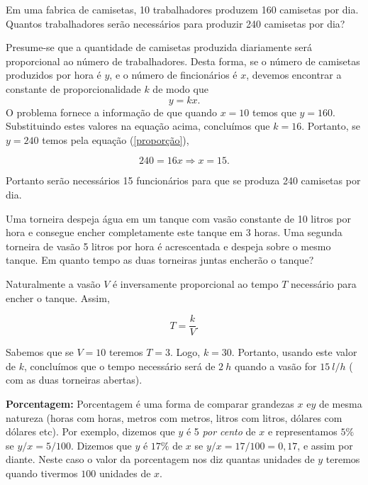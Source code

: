 \begin{exemplo} Em uma fabrica de camisetas, 10 trabalhadores produzem 160 camisetas por dia. Quantos trabalhadores serão necessários para produzir 240 camisetas por dia?

Presume-se que a quantidade de camisetas  produzida diariamente será proporcional ao número de trabalhadores. Desta forma,
se o número de camisetas produzidos por hora é $y$, e o número de fincionários é $x$, devemos encontrar a constante de proporcionalidade $k$ de modo que
\begin{equation}\label{proporção}y=kx.\end{equation}
O problema fornece a informação de que quando $x=10$ temos que $y=160$. Substituindo estes valores na equação acima, concluímos que $k=16$. Portanto, se $y=240$ temos pela equação (\ref{proporção}),

$$240= 16x\Rightarrow x=15.$$

Portanto serão necessários 15 funcionários para que se produza 240 camisetas por dia.
\end{exemplo}

\begin{exemplo} Uma torneira despeja água em um tanque com vasão constante de 10 litros por hora e consegue encher completamente este tanque em 3 horas. Uma segunda torneira de vasão 5 litros por hora é acrescentada e despeja sobre o mesmo tanque. Em quanto tempo as duas torneiras juntas encherão o tanque?

Naturalmente a vasão $V$ é inversamente proporcional ao tempo $T$ necessário para encher o tanque. Assim,

$$T=\frac{k}{V}.$$

Sabemos que se $V=10$ teremos $T=3$. Logo, $k=30$. Portanto, usando este valor de $k$, concluímos que o tempo necessário será de $2\ h$ quando a vasão for  $15\  l/h$ ( com as duas torneiras abertas).

\end{exemplo}



\noindent\textbf{Porcentagem:} Porcentagem é uma forma de comparar grandezas $x$ e$ y$ de mesma natureza (horas com horas, metros com metros, litros com litros, dólares com dólares etc).  Por exemplo, dizemos que $y$ é 5 \textit{por cento} de $x$ e representamos $5\%$  se $y/x=5/100$. Dizemos que $y$ é $17\%$ de $x$  se $y/x=17/100=0,17$, e assim por diante. Neste caso
o valor da porcentagem nos diz quantas unidades de $y$ teremos quando tivermos $100$ unidades de $x$.

